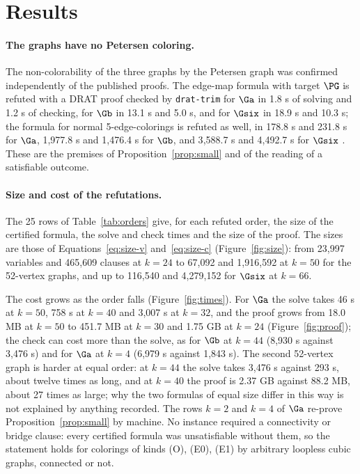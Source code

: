 \section{Results}\label{sec:results}

\paragraph{The graphs have no Petersen coloring.} The non-colorability of the three graphs by the Petersen graph was confirmed independently of the published proofs. The edge-map formula with target $\PG$ is refuted with a DRAT proof checked by \texttt{drat-trim} for
$\Ga$ in 1.8 s of solving and 1.2 s of checking, for $\Gb$ in 13.1 s and 5.0 s, and for $\Gsix$ in 18.9 s and 10.3 s; the formula for normal 5-edge-colorings is refuted as well, in 178.8 s and 231.8 s for $\Ga$, 1{,}977.8 s and 1{,}476.4 s for $\Gb$, and 3{,}588.7 s and 4{,}492.7 s for $\Gsix$ \evMV{}.
These are the premises of Proposition~\ref{prop:small} and of the reading of a satisfiable outcome.


\paragraph{Size and cost of the refutations.} The 25 rows of Table~\ref{tab:orders} give, for each refuted order, the size of the certified formula, the solve and check times and the size of the proof. The sizes are those of Equations~\eqref{eq:size-v} and~\eqref{eq:size-c} (Figure~\ref{fig:size}): from 23{,}997 variables and 465{,}609
clauses at $k = 24$ to 67{,}092 and 1{,}916{,}592 at $k = 50$ for the 52-vertex graphs, and up to 116{,}540 and 4{,}279{,}152 for $\Gsix$ at $k = 66$.


The cost grows as the order falls (Figure~\ref{fig:times}). For $\Ga$ the solve takes 46 s at $k = 50$, 758 s at $k = 40$ and 3{,}007 s at $k = 32$, and the proof grows from 18.0 MB at $k = 50$ to 451.7 MB at $k = 30$ and 1.75 GB at $k = 24$ (Figure~\ref{fig:proof}); the check can cost more than the solve, as for $\Gb$ at $k = 44$ (8{,}930 s against 3{,}476 s) and for $\Ga$ at $k = 4$
(6{,}979 s against 1{,}843 s). The second 52-vertex graph is harder at equal order: at $k = 44$ the solve takes 3{,}476 s against 293 s, about twelve times as long, and at $k = 40$ the proof is 2.37 GB against 88.2 MB, about 27 times as large; why the two formulas of equal size differ in this way is not explained by anything recorded. The
rows $k = 2$ and $k = 4$ of $\Ga$ re-prove Proposition~\ref{prop:small} by machine. No instance required a connectivity or bridge clause: every certified formula was unsatisfiable without them, so the statement holds for colorings of kinds (O), (E0), (E1) by arbitrary loopless cubic graphs, connected or not.

